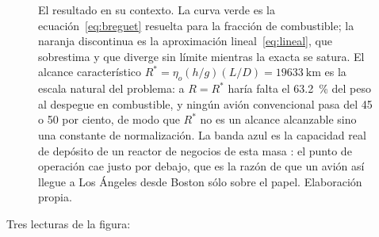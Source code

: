 \documentclass[11pt,letterpaper]{article}
\newcommand{\cRx}[1]{#1*0.655}     %
\newcommand{\cRy}[1]{#1*0.0620}     %
\begin{document}
\begin{figure}[htbp]
\caption{El resultado en su contexto. La curva verde es la
ecuación~\eqref{eq:breguet} resuelta para la fracción de combustible; la
naranja discontinua es la aproximación lineal~\eqref{eq:lineal}, que sobrestima
y que diverge sin límite mientras la exacta se satura. El alcance
característico \(R^{*} = \eta_o (h/g)(L/D) = \SI{19633}{\kilo\meter}\) es la
escala natural del problema: a \(R = R^{*}\) haría falta el
\SI{63.2}{\percent} del peso al despegue en combustible, y ningún avión
convencional pasa del 45 o 50 por ciento, de modo que \(R^{*}\) no es un
alcance alcanzable sino una constante de normalización. La banda azul es la
capacidad real de depósito de un reactor de negocios de esta masa
\parencite{learjet75}: el punto de operación cae justo por debajo, que es la
razón de que un avión así llegue a Los Ángeles desde Boston sólo sobre el
papel. Elaboración propia.}
\label{fig:curva}
\end{figure}

Tres lecturas de la figura:
\end{document}
